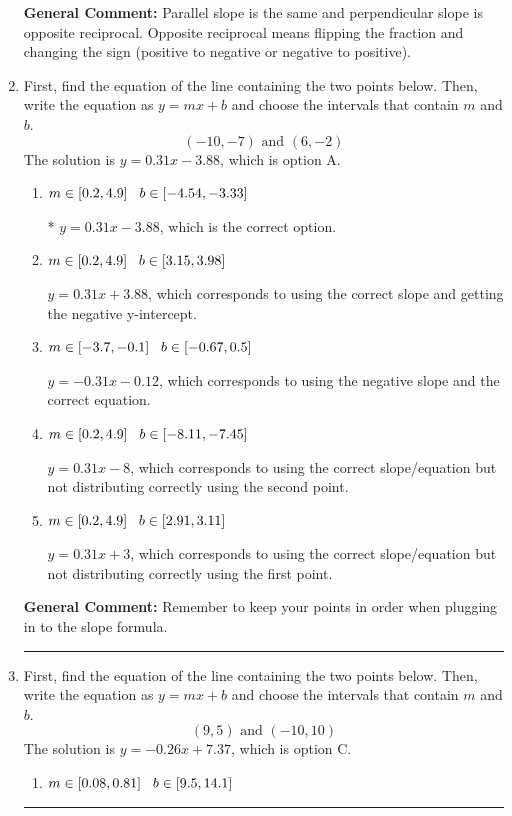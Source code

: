 \documentclass{extbook}[14pt]
\newcommand{\litem}[1]{\item #1

\rule{\textwidth}{0.4pt}}
\begin{document}
\begin{enumerate}
{\textbf{General Comment:} Parallel slope is the same and perpendicular slope is opposite reciprocal. Opposite reciprocal means flipping the fraction and changing the sign (positive to negative or negative to positive).
}
\litem{
First, find the equation of the line containing the two points below. Then, write the equation as $ y=mx+b $ and choose the intervals that contain $m$ and $b$.
\[ (-10, -7) \text{ and } (6, -2) \]The solution is \( y = 0.31x -3.88 \), which is option A.\begin{enumerate}[label=\Alph*.]
\item \( m \in [0.2, 4.9] \hspace*{3mm} b \in [-4.54, -3.33] \)

* $y = 0.31x -3.88$, which is the correct option.
\item \( m \in [0.2, 4.9] \hspace*{3mm} b \in [3.15, 3.98] \)

 $y = 0.31x + 3.88$, which corresponds to using the correct slope and getting the negative y-intercept.
\item \( m \in [-3.7, -0.1] \hspace*{3mm} b \in [-0.67, 0.5] \)

 $y = -0.31x -0.12$, which corresponds to using the negative slope and the correct equation.
\item \( m \in [0.2, 4.9] \hspace*{3mm} b \in [-8.11, -7.45] \)

 $y = 0.31x -8$, which corresponds to using the correct slope/equation but not distributing correctly using the second point.
\item \( m \in [0.2, 4.9] \hspace*{3mm} b \in [2.91, 3.11] \)

 $y = 0.31x + 3$, which corresponds to using the correct slope/equation but not distributing correctly using the first point.
\end{enumerate}

\textbf{General Comment:} Remember to keep your points in order when plugging in to the slope formula.
}
\litem{
First, find the equation of the line containing the two points below. Then, write the equation as $ y=mx+b $ and choose the intervals that contain $m$ and $b$.
\[ (9, 5) \text{ and } (-10, 10) \]The solution is \( y = -0.26x + 7.37 \), which is option C.\begin{enumerate}[label=\Alph*.]
\item \( m \in [0.08, 0.81] \hspace*{3mm} b \in [9.5, 14.1] \)


\end{enumerate}}
\end{enumerate}
\end{document}
